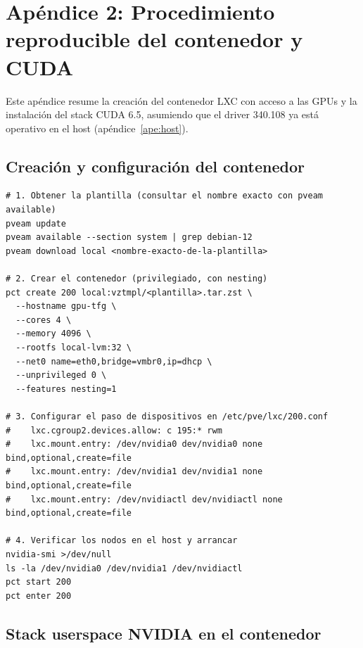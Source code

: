 \setcounter{chapter}{7}
\setcounter{section}{0}
\setcounter{table}{0}
\setcounter{figure}{0}


\makeatletter
\def\@currentlabel{\thechapter}
\makeatother
\label{ape:contenedor-cuda}

\chapter*{Apéndice 2: Procedimiento reproducible del contenedor y CUDA}

Este apéndice resume la creación del contenedor LXC con acceso a las GPUs y la instalación del stack CUDA 6.5, asumiendo que el driver 340.108 ya está operativo en el host (apéndice~\ref{ape:host}).

\section{Creación y configuración del contenedor}

\begin{Verbatim}
# 1. Obtener la plantilla (consultar el nombre exacto con pveam available)
pveam update
pveam available --section system | grep debian-12
pveam download local <nombre-exacto-de-la-plantilla>

# 2. Crear el contenedor (privilegiado, con nesting)
pct create 200 local:vztmpl/<plantilla>.tar.zst \
  --hostname gpu-tfg \
  --cores 4 \
  --memory 4096 \
  --rootfs local-lvm:32 \
  --net0 name=eth0,bridge=vmbr0,ip=dhcp \
  --unprivileged 0 \
  --features nesting=1

# 3. Configurar el paso de dispositivos en /etc/pve/lxc/200.conf
#    lxc.cgroup2.devices.allow: c 195:* rwm
#    lxc.mount.entry: /dev/nvidia0 dev/nvidia0 none bind,optional,create=file
#    lxc.mount.entry: /dev/nvidia1 dev/nvidia1 none bind,optional,create=file
#    lxc.mount.entry: /dev/nvidiactl dev/nvidiactl none bind,optional,create=file

# 4. Verificar los nodos en el host y arrancar
nvidia-smi >/dev/null
ls -la /dev/nvidia0 /dev/nvidia1 /dev/nvidiactl
pct start 200
pct enter 200
\end{Verbatim}

\section{Stack userspace NVIDIA en el contenedor}

